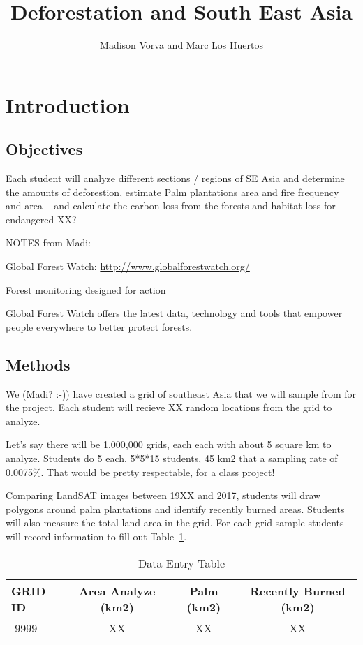 \documentclass{article}\usepackage[]{graphicx}\usepackage[]{color}
\title{Deforestation and South East Asia}
\author{Madison Vorva and Marc Los Huertos}
\begin{document}
\maketitle

\section{Introduction}

\subsection{Objectives}

Each student will analyze different sections / regions of SE Asia and determine the amounts of deforestion, estimate Palm plantations area and fire frequency and area -- and calculate the carbon loss from the forests and habitat loss for endangered XX?

NOTES from Madi:


Global Forest Watch:
\url{http://www.globalforestwatch.org/}


Forest monitoring designed for action

\href{www.globalforestwatch.org}{Global Forest Watch} offers the latest data, technology and tools that empower people everywhere to better protect forests.


\subsection{Methods}

We (Madi? :-)) have created a grid of southeast Asia that we will sample from for the project. Each student will recieve XX random locations from the grid to analyze. 

Let's say there will be 1,000,000 grids, each each with about 5 square km to analyze. Students do 5 each. 5*5*15 students, 45 km2 that a sampling rate of 0.0075\%. That would be pretty respectable, for a class project!

Comparing LandSAT images between 19XX and 2017, students will draw polygons around palm plantations and identify recently burned areas. Students will also measure the total land area in the grid. For each grid sample students will record information to fill out Table~\ref{tab:dataentry}.

\begin{table}[h]
\caption{Data Entry Table}
\label{tab:dataentry}
\begin{tabular}{|l|c|c|c|} \hline
GRID ID  & Area Analyze (km2)  &  Palm (km2) &  Recently Burned (km2) \\ \hline\hline
-9999     & XX    & XX  & XX  \\

\hline
\end{tabular}
\end{table}
\end{document}
